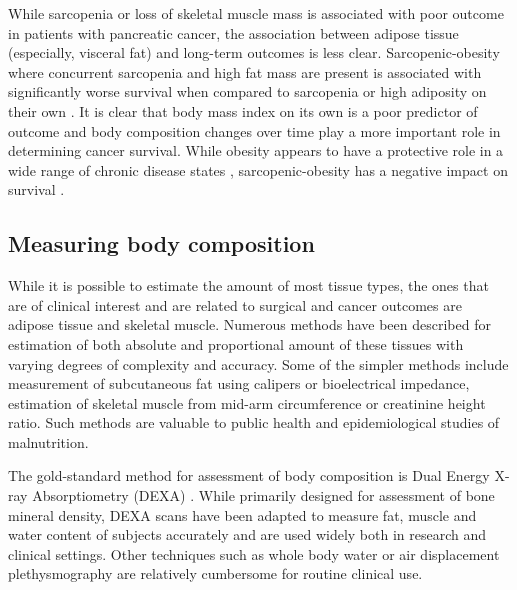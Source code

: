 While sarcopenia or loss of skeletal muscle mass is associated with poor outcome in patients with pancreatic cancer, the association between adipose tissue (especially, visceral fat) and long-term outcomes is less clear. 
Sarcopenic-obesity where concurrent sarcopenia and high fat mass are present is associated with significantly worse survival when compared to sarcopenia or high adiposity on their own \parencite{tan_sarcopenia_2009}. 
It is clear that body mass index on its own is a poor predictor of outcome and body composition changes over time play a more important role in determining cancer survival. 
While obesity appears to have a protective role in a wide range of chronic disease states \parencite{kalantar-zadeh_risk_2007, amundson_obesity_2010, myers_obesity_2011}, sarcopenic-obesity has a negative impact on survival \parencite{tan_sarcopenia_2009}.

\subsection{Measuring body composition}
While it is possible to estimate the amount of most tissue types, the ones that are of clinical interest and are related to surgical and cancer outcomes are adipose tissue and skeletal muscle. 
Numerous methods have been described for estimation of both absolute and proportional amount of these tissues with varying degrees of complexity and accuracy. 
Some of the simpler methods include measurement of subcutaneous fat using calipers or bioelectrical impedance, estimation of skeletal muscle from mid-arm circumference or creatinine height ratio. 
Such methods are valuable to public health and epidemiological studies of malnutrition. 

The gold-standard method for assessment of body composition is Dual Energy X-ray Absorptiometry (DEXA) \parencite{haarbo_validation_1991}. 
While primarily designed for assessment of bone mineral density, DEXA scans have been adapted to measure fat, muscle and water content of subjects accurately and are used widely both in research and clinical settings. 
Other techniques such as whole body water or air displacement plethysmography are relatively cumbersome for routine clinical use.

